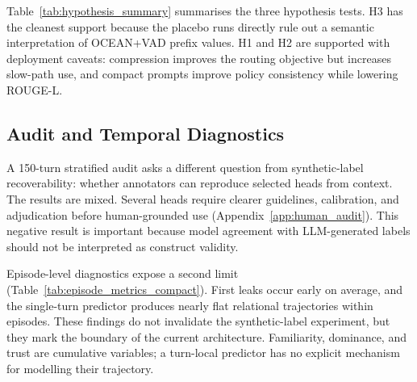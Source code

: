 \documentclass[11pt]{article}
\begin{document}
Table~\ref{tab:hypothesis_summary} summarises the three hypothesis tests. H3 has the cleanest support because the placebo runs directly rule out a semantic interpretation of OCEAN+VAD prefix values. H1 and H2 are supported with deployment caveats: compression improves the routing objective but increases slow-path use, and compact prompts improve policy consistency while lowering ROUGE-L.

\begin{table}[t]
\centering
\caption{Hypothesis summary. Each hypothesis is evaluated against its target metric.}
\label{tab:hypothesis_summary}
\small
{}
\end{table}

\subsection{Audit and Temporal Diagnostics}

A 150-turn stratified audit asks a different question from synthetic-label recoverability: whether annotators can reproduce selected heads from context. The results are mixed. Several heads require clearer guidelines, calibration, and adjudication before human-grounded use (Appendix~\ref{app:human_audit}). This negative result is important because model agreement with LLM-generated labels should not be interpreted as construct validity.

Episode-level diagnostics expose a second limit (Table~\ref{tab:episode_metrics_compact}). First leaks occur early on average, and the single-turn predictor produces nearly flat relational trajectories within episodes. These findings do not invalidate the synthetic-label experiment, but they mark the boundary of the current architecture. Familiarity, dominance, and trust are cumulative variables; a turn-local predictor has no explicit mechanism for modelling their trajectory.
\end{document}
